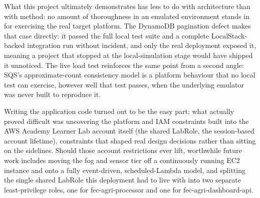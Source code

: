 \documentclass[conference]{IEEEtran}
\begin{document}
What this project ultimately demonstrates has less to do with architecture than with method: no amount of thoroughness in an emulated environment stands in for exercising the real target platform. The DynamoDB pagination defect makes that case directly: it passed the full local test suite and a complete LocalStack-backed integration run without incident, and only the real deployment exposed it, meaning a project that stopped at the local-simulation stage would have shipped it unnoticed. The live load test reinforces the same point from a second angle: SQS's approximate-count consistency model is a platform behaviour that no local test can exercise, however well that test passes, when the underlying emulator was never built to reproduce it.

Writing the application code turned out to be the easy part; what actually proved difficult was uncovering the platform and IAM constraints built into the AWS Academy Learner Lab account itself (the shared LabRole, the session-based account lifetime), constraints that shaped real design decisions rather than sitting on the sidelines. Should those account restrictions ever lift, worthwhile future work includes moving the fog and sensor tier off a continuously running EC2 instance and onto a fully event-driven, scheduled-Lambda model, and splitting the single shared LabRole this deployment had to live with into two separate least-privilege roles, one for fec-agri-processor and one for fec-agri-dashboard-api.



\end{document}
